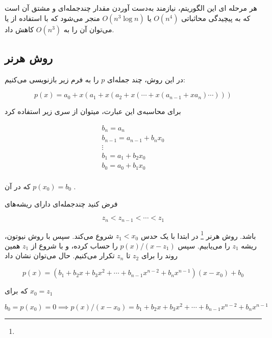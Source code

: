 هر مرحله ای این الگوریتم، نیازمند به‌دست آوردن مقدار چندجمله‌ای و مشتق آن است
که به پیچیدگی محاثباتی
$O(n^4)$
یا
$O(n^3 \log n)$
منجر می‌شود که با استفاده از
یا
می‌توان آن را به
$O(n^3)$
کاهش داد.

\subsection{روش هرنر}
در این روش، چند جمله‌ای
$p$
را به فرم زیر بازنویسی می‌کنیم:

\begin{equation}
  p(x) = a_0 + x (a_1 + x (a_2 + x (\cdots +x(a_{n-1} + x a_{n}) \cdots)))
\end{equation}

برای محاسبه‌ی این عبارت، میتوان از سری زیر استفاده کرد

\begin{equation}
  \begin{split}
    b_n = a_n \\
    b_{n-1} = a_{n-1} + b_n x_0 \\
    \vdots \\
    b_1 = a_1 + b_2 x_0 \\
    b_0 = a_0 + b_1 x_0 \\
  \end{split}
\end{equation}

که در آن
$p(x_0)=b_0$
.


فرض کنید چند‌جمله‌ای دارای ریشه‌های

\begin{equation}
  z_n < z_{n-1} < \cdots < z_1
\end{equation}

باشد.
روش
هرنر
\footnote{}
در ابتدا با یک حدس
$z_1 < x_0$
شروع می‌کند.
سپس
با روش نیوتون،‌ ریشه
$z_1$
را می‌یابیم.
سپس
$p(x) / (x - z_1)$
را حساب کرده،‌ و با شروع از
$z_1$
همین روند را برای
$z_2$
تا
$z_n$
تکرار می‌کنیم.
حال می‌توان نشان داد

\begin{equation}
  p(x) = (b_1 + b_2x + b_3 x^2 + \cdots + b_{n-1} x^{n - 2} + b_{n} x^{n - 1}) (x - x_0) + b_0
\end{equation}

که برای
$x_0=z_1$

\begin{equation}
  b_0 = p(x_0) = 0
  \implies
  p(x) / (x - x_0) = b_1 + b_2x + b_3 x^2 + \cdots + b_{n-1} x^{n - 2} + b_{n} x^{n - 1}
\end{equation}



